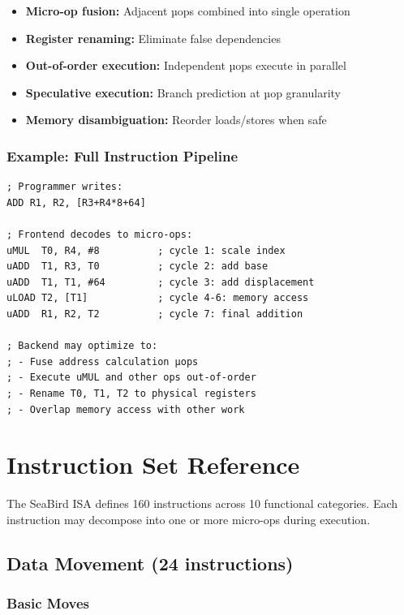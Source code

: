 \documentclass[12pt]{article}
\begin{document}
\begin{itemize}
    \item \textbf{Micro-op fusion:} Adjacent µops combined into single operation
    \item \textbf{Register renaming:} Eliminate false dependencies
    \item \textbf{Out-of-order execution:} Independent µops execute in parallel
    \item \textbf{Speculative execution:} Branch prediction at µop granularity
    \item \textbf{Memory disambiguation:} Reorder loads/stores when safe
\end{itemize}

\subsubsection{Example: Full Instruction Pipeline}

\begin{lstlisting}
; Programmer writes:
ADD R1, R2, [R3+R4*8+64]

; Frontend decodes to micro-ops:
uMUL  T0, R4, #8          ; cycle 1: scale index
uADD  T1, R3, T0          ; cycle 2: add base
uADD  T1, T1, #64         ; cycle 3: add displacement
uLOAD T2, [T1]            ; cycle 4-6: memory access
uADD  R1, R2, T2          ; cycle 7: final addition

; Backend may optimize to:
; - Fuse address calculation µops
; - Execute uMUL and other ops out-of-order
; - Rename T0, T1, T2 to physical registers
; - Overlap memory access with other work
\end{lstlisting}

\section{Instruction Set Reference}

The SeaBird ISA defines 160 instructions across 10 functional categories. Each instruction may decompose into one or more micro-ops during execution.

\subsection{Data Movement (24 instructions)}

\subsubsection{Basic Moves}
\end{document}
